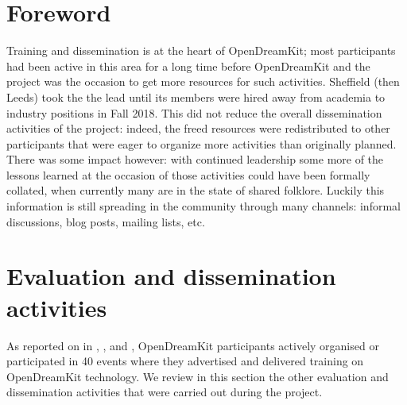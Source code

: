 \documentclass{deliverablereport}
\author{Mike Croucher, Hans Fangohr and Nicolas M. Thiéry}
\begin{document}
\maketitle
\enlargethispage{.5cm}
\githubissuedescription
\clearpage
\tableofcontents


\section*{Foreword}

Training and dissemination is at the heart of OpenDreamKit; most
participants had been active in this area for a long time before
OpenDreamKit and the project was the occasion to get more resources
for such activities. Sheffield (then Leeds) took the the lead until its
members were hired away from academia to industry positions in Fall
2018. This did not reduce the overall dissemination activities of the
project: indeed, the freed resources were redistributed to other
participants that were eager to organize more activities than
originally planned. There was some impact however: with continued
leadership some more of the lessons learned at the occasion of those
activities could have been formally collated, when currently many are
in the state of shared folklore. Luckily this information is still
spreading in the community through many channels: informal
discussions, blog posts, mailing lists, etc.

\section{Evaluation and dissemination activities}

As reported on in ,
, and ,
OpenDreamKit participants actively organised or participated in 40
events where they advertised and delivered training on OpenDreamKit
technology. We review in this section the other evaluation and
dissemination activities that were carried out during the project.



\end{document}
